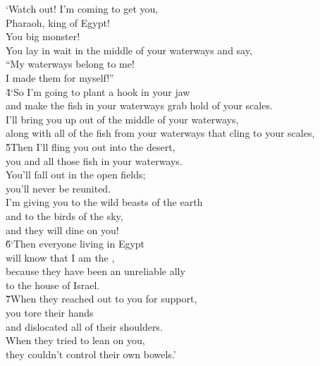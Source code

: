 \begin{poetry}
\poeml `Watch out! I'm coming to get you, \\
\poemll    Pharaoh, king of Egypt! \\
\poeml You big monster! \\
\poemll    You lay in wait in the middle of your waterways and say, \\
\poeml ``My waterways belong to me! \\
\poemll    I made them for myself!'' \\
\poeml \v{4}`So I'm going to plant a hook in your jaw \\
\poemll    and make the fish in your waterways grab hold of your scales. \\
\poeml I'll bring you up out of the middle of your waterways, \\
\poemll    along with all of the fish from your waterways that cling to your scales, \\
\poeml \v{5}Then I'll fling you out into the desert, \\
\poemll    you and all those fish in your waterways. \\
\poeml You'll fall out in the open fields; \\
\poemll    you'll never be reunited. \\
\poeml I'm giving you to the wild beasts of the earth \\
\poemll    and to the birds of the sky, \\
\poemlll       and they will dine on you! \\
\poeml \v{6}`Then everyone living in Egypt \\
\poemll    will know that I am the , \\
\poeml because they have been an unreliable ally \\
\poemll    to the house of Israel. \\
\poeml \v{7}When they reached out to you for support, \\
\poemll    you tore their hands \\
\poemlll       and dislocated all of their shoulders. \\
\poeml When they tried to lean on you, \\
\poemll    they couldn't control their own bowels.'
\end{poetry}

